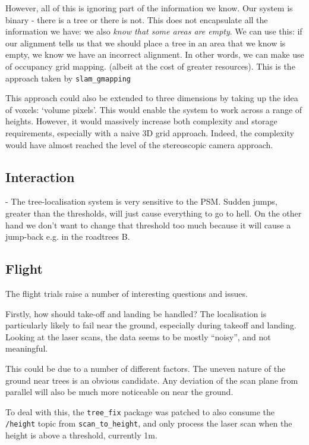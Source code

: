 \documentclass[12pt,oneside,a4paper]{book}
\begin{document}
However, all of this is ignoring part of the information we know. Our
system is binary - there is a tree or there is not. This does not
encapsulate all the information we have: we also \emph{know that some areas
are empty}. We can use this: if our alignment tells us that we should
place a tree in an area that we know is empty, we know we have an
incorrect alignment. In other words, we can make use of occupancy grid
mapping. (albeit at the cost of greater resources). This is the
approach taken by \texttt{slam\_gmapping} 

This approach could also be extended to three dimensions by taking up
the idea of voxels: `volume pixels'. This would enable the system to
work across a range of heights. However, it would massively increase
both complexity and storage requirements, especially with a naive 3D
grid approach. Indeed, the complexity would have almost reached the
level of the stereoscopic camera approach.


\subsection{Interaction}
\label{sec:interaction}

 - The tree-localisation system is very sensitive to the PSM. Sudden jumps, greater than
 the thresholds, will just cause everything to go to hell. On the
 other hand we don't want to change that threshold too much because it
 will cause a jump-back e.g. in the roadtrees B.

\subsection{Flight}
\label{sec:flight}

The flight trials raise a number of interesting questions and issues.

Firstly, how should take-off and landing be handled? The localisation
is particularly likely to fail near the ground, especially during
takeoff and landing. Looking at the laser scans, the data seems to be
mostly ``noisy'', and not meaningful.

This could be due to a number of different factors. The uneven nature
of the ground near trees is an obvious candidate. Any deviation of the
scan plane from parallel will also be much more noticeable on near the
ground.

To deal with this, the \texttt{tree\_fix} package was patched to also
consume the \texttt{/height} topic from \texttt{scan\_to\_height}, and
only process the laser scan when the height is above a threshold,
currently 1m.
\end{document}

